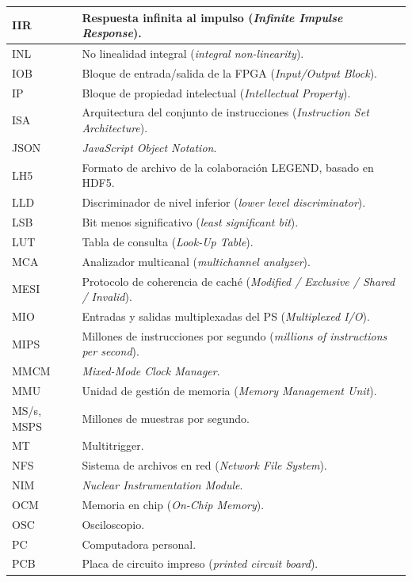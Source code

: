 {\begin{longtable}{|>{\raggedright\arraybackslash}p{}%
  |>{\raggedright\arraybackslash}p{}|}
IIR & Respuesta infinita al impulso (\emph{Infinite Impulse Response}). \\ \hline
INL & No linealidad integral (\emph{integral non-linearity}). \\ \hline
IOB & Bloque de entrada/salida de la FPGA (\emph{Input/Output Block}). \\ \hline
IP & Bloque de propiedad intelectual (\emph{Intellectual Property}). \\ \hline
ISA & Arquitectura del conjunto de instrucciones (\emph{Instruction Set Architecture}). \\ \hline
JSON & \emph{JavaScript Object Notation}. \\ \hline
LH5 & Formato de archivo de la colaboración LEGEND, basado en HDF5. \\ \hline
LLD & Discriminador de nivel inferior (\emph{lower level discriminator}). \\ \hline
LSB & Bit menos significativo (\emph{least significant bit}). \\ \hline
LUT & Tabla de consulta (\emph{Look-Up Table}). \\ \hline
MCA & Analizador multicanal (\emph{multichannel analyzer}). \\ \hline
MESI & Protocolo de coherencia de caché (\emph{Modified / Exclusive / Shared / Invalid}). \\ \hline
MIO & Entradas y salidas multiplexadas del PS (\emph{Multiplexed I/O}). \\ \hline
MIPS & Millones de instrucciones por segundo (\emph{millions of instructions per second}). \\ \hline
MMCM & \emph{Mixed-Mode Clock Manager}. \\ \hline
MMU & Unidad de gestión de memoria (\emph{Memory Management Unit}). \\ \hline
MS/s, MSPS & Millones de muestras por segundo. \\ \hline
MT & Multitrigger. \\ \hline
NFS & Sistema de archivos en red (\emph{Network File System}). \\ \hline
NIM & \emph{Nuclear Instrumentation Module}. \\ \hline
OCM & Memoria en chip (\emph{On-Chip Memory}). \\ \hline
OSC & Osciloscopio. \\ \hline
PC & Computadora personal. \\ \hline
PCB & Placa de circuito impreso (\emph{printed circuit board}). \\ \hline

\end{longtable}}
